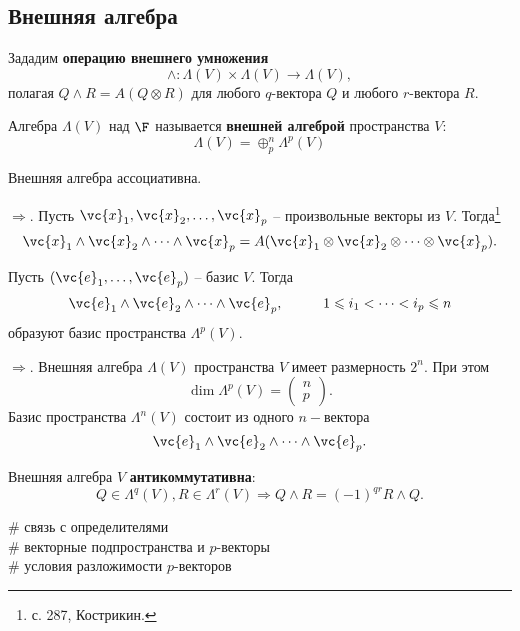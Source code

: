 \subsection{Внешняя алгебра}

\begin{to_def}
    Зададим \textbf{операцию внешнего умножения}
    \begin{equation}
        \wedge \colon \Lambda(V) \times \Lambda(V) \to \Lambda (V),
    \end{equation}
    полагая 
    $
        Q \wedge R = A(Q \otimes R)
    $
    для любого $q$-вектора $Q$ и любого $r$-вектора $R$. 
\end{to_def}

\begin{to_def}
    Алгебра $\Lambda (V)$ над $\F$ называется \textbf{внешней алгеброй} пространства $V$:
    \begin{equation}
        \Lambda(V) = \oplus_p^n \Lambda^p (V)
    \end{equation}
\end{to_def}

\begin{to_thr}
    Внешняя алгебра ассоциативна.
\end{to_thr}

\noindent
$\boxed{\Rightarrow}$. Пусть $\vc{x}_1, \vc{x}_2, \dots, \vc{x}_p$ -- произвольные векторы из $V$. Тогда\footnote{
    с. 287, Кострикин.
} 
\begin{equation}
    \vc{x}_1 \wedge \vc{x}_2 \wedge \dots \wedge \vc{x}_p = A(\vc{x}_1 \otimes \vc{x}_2 \otimes \dots \otimes \vc{x}_p).
\end{equation}

\begin{to_thr}
    Пусть $(\vc{e}_1, \dots, \vc{e}_p)$ -- базис $V$. Тогда 
    \begin{equation}
        \vc{e}_1 \wedge \vc{e}_2 \wedge \dots \wedge \vc{e}_p, \hspace{1cm} 1 \leqslant i_1 < \dots < i_p \leqslant n
    \end{equation}
    образуют базис пространства $\Lambda^p(V)$.
\end{to_thr}

\noindent
$\boxed{\Rightarrow}$. Внешняя алгебра $\Lambda(V)$ пространства $V$ имеет размерность $2^n$. При этом 
\begin{equation}
    \dim \Lambda^p (V) = \begin{pmatrix}
        n \\ p
    \end{pmatrix}.
\end{equation}
Базис пространства $\Lambda^n (V)$ состоит из одного $n-$вектора 
$$
    \vc{e}_1 \wedge \vc{e}_2 \wedge \dots \wedge \vc{e}_p.
$$

Внешняя алгебра $V$ \textbf{антикоммутативна}:
\begin{equation}
    Q \in \Lambda^q(V), R \in \Lambda^r(V) \Rightarrow Q \wedge R = (-1)^{qr} R \wedge Q.
\end{equation}


\noindent
\# связь с определителями\\
\# векторные подпространства и $p$-векторы\\
\# условия разложимости $p$-векторов


